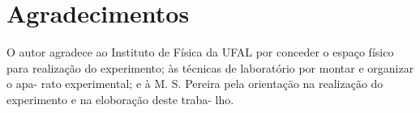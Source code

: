 \section*{Agradecimentos}

O autor agradece ao Instituto de Física da UFAL por
conceder o espaço físico para realização do experimento;
às técnicas de laboratório por montar e organizar o apa-
rato experimental; e à M. S. Pereira pela orientação na
realização do experimento e na eloboração deste traba-
lho.